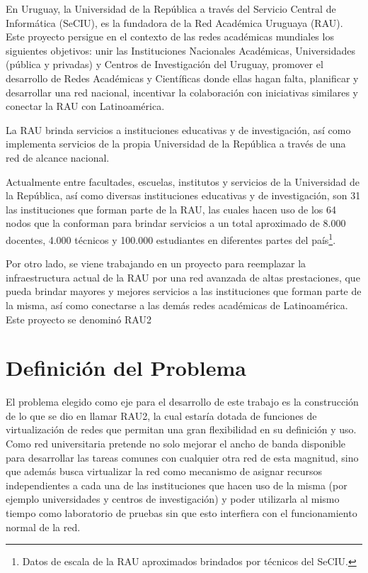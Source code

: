 En Uruguay, la Universidad de la República a través del Servicio Central de Informática (SeCIU), es la fundadora de la Red Académica Uruguaya (RAU). Este proyecto persigue en el contexto de las redes académicas mundiales los siguientes objetivos: unir las Instituciones Nacionales Académicas, Universidades (pública y privadas) y Centros de Investigación del Uruguay, promover el desarrollo de Redes Académicas y Científicas donde ellas hagan falta, planificar y desarrollar una red nacional, incentivar la colaboración con iniciativas similares y conectar la RAU con Latinoamérica. 

La RAU brinda servicios a instituciones educativas y de investigación, as\'i como implementa servicios de la propia Universidad de la República a trav\'es de una red de alcance nacional.

Actualmente entre facultades, escuelas, institutos y servicios de la Universidad de la República, así como diversas instituciones educativas y de investigación, son 31 las instituciones que forman parte de la RAU, las cuales hacen uso de los 64 nodos que la conforman para brindar servicios a un total aproximado de 8.000 docentes, 4.000 técnicos y 100.000 estudiantes en diferentes partes del país\footnote{Datos de escala de la RAU aproximados brindados por t\'ecnicos del SeCIU.}.

Por otro lado, se viene trabajando en un proyecto para reemplazar la infraestructura actual de la RAU por una red avanzada de altas prestaciones, que pueda brindar mayores y mejores servicios a las instituciones que forman parte de la misma, así como conectarse a las demás redes académicas de Latinoam\'erica. Este proyecto se denomin\'o RAU2  

\section{Definición del Problema}

El problema elegido como eje para el desarrollo de este trabajo es la 
construcción de lo que se dio en llamar RAU2, la cual estaría dotada de funciones de virtualización de redes que permitan una gran flexibilidad en su definición y uso. Como red universitaria pretende no solo mejorar el ancho de banda disponible para desarrollar las tareas comunes con cualquier otra red de esta magnitud, sino que además busca virtualizar la red como mecanismo de asignar recursos independientes a cada una de las instituciones que hacen uso de la misma (por ejemplo universidades y centros de investigación) y poder utilizarla al mismo tiempo como laboratorio de pruebas sin que esto interfiera con el funcionamiento normal de la red.\\

